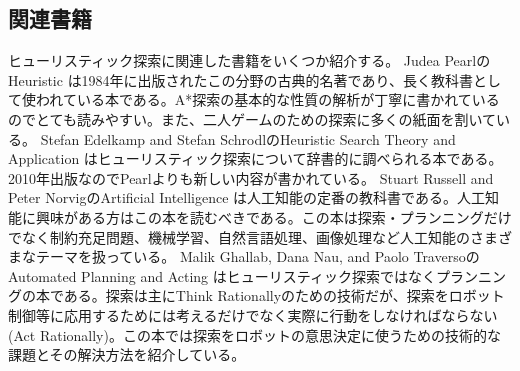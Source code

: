 \subsection{関連書籍}

ヒューリスティック探索に関連した書籍をいくつか紹介する。
Judea PearlのHeuristic \cite{pearl84}は1984年に出版されたこの分野の古典的名著であり、長く教科書として使われている本である。A*探索の基本的な性質の解析が丁寧に書かれているのでとても読みやすい。また、二人ゲームのための探索に多くの紙面を割いている。
Stefan Edelkamp and Stefan SchrodlのHeuristic Search Theory and Application \cite{edelkamp:2010:hst:1875144}はヒューリスティック探索について辞書的に調べられる本である。2010年出版なのでPearlよりも新しい内容が書かれている。
Stuart Russell and Peter NorvigのArtificial Intelligence \cite{russelln03}は人工知能の定番の教科書である。人工知能に興味がある方はこの本を読むべきである。この本は探索・プランニングだけでなく制約充足問題、機械学習、自然言語処理、画像処理など人工知能のさまざまなテーマを扱っている。
Malik Ghallab, Dana Nau, and Paolo TraversoのAutomated Planning and Acting \cite{ghallab:04}はヒューリスティック探索ではなくプランニングの本である。探索は主にThink Rationallyのための技術だが、探索をロボット制御等に応用するためには考えるだけでなく実際に行動をしなければならない(Act Rationally)。この本では探索をロボットの意思決定に使うための技術的な課題とその解決方法を紹介している。



